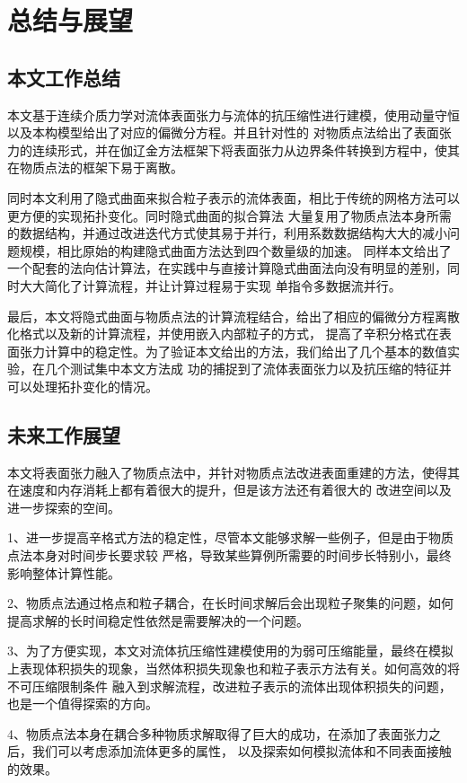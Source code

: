 \chapter{总结与展望}
\section{本文工作总结}
本文基于连续介质力学对流体表面张力与流体的抗压缩性进行建模，使用动量守恒以及本构模型给出了对应的偏微分方程。并且针对性的
对物质点法给出了表面张力的连续形式，并在伽辽金方法框架下将表面张力从边界条件转换到方程中，使其在物质点法的框架下易于离散。

同时本文利用了隐式曲面来拟合粒子表示的流体表面，相比于传统的网格方法可以更方便的实现拓扑变化。同时隐式曲面的拟合算法
大量复用了物质点法本身所需的数据结构，并通过改进迭代方式使其易于并行，利用系数数据结构大大的减小问题规模，相比原始的构建隐式曲面方法达到四个数量级的加速。
同样本文给出了一个配套的法向估计算法，在实践中与直接计算隐式曲面法向没有明显的差别，同时大大简化了计算流程，并让计算过程易于实现
单指令多数据流并行。

最后，本文将隐式曲面与物质点法的计算流程结合，给出了相应的偏微分方程离散化格式以及新的计算流程，并使用嵌入内部粒子的方式，
提高了辛积分格式在表面张力计算中的稳定性。为了验证本文给出的方法，我们给出了几个基本的数值实验，在几个测试集中本文方法成
功的捕捉到了流体表面张力以及抗压缩的特征并可以处理拓扑变化的情况。
\section{未来工作展望}
本文将表面张力融入了物质点法中，并针对物质点法改进表面重建的方法，使得其在速度和内存消耗上都有着很大的提升，但是该方法还有着很大的
改进空间以及进一步探索的空间。

1、进一步提高辛格式方法的稳定性，尽管本文能够求解一些例子，但是由于物质点法本身对时间步长要求较
严格，导致某些算例所需要的时间步长特别小，最终影响整体计算性能。

2、物质点法通过格点和粒子耦合，在长时间求解后会出现粒子聚集的问题，如何提高求解的长时间稳定性依然是需要解决的一个问题。

3、为了方便实现，本文对流体抗压缩性建模使用的为弱可压缩能量，最终在模拟上表现体积损失的现象，当然体积损失现象也和粒子表示方法有关。如何高效的将不可压缩限制条件
融入到求解流程，改进粒子表示的流体出现体积损失的问题，也是一个值得探索的方向。

4、物质点法本身在耦合多种物质求解取得了巨大的成功，在添加了表面张力之后，我们可以考虑添加流体更多的属性，
以及探索如何模拟流体和不同表面接触的效果。
